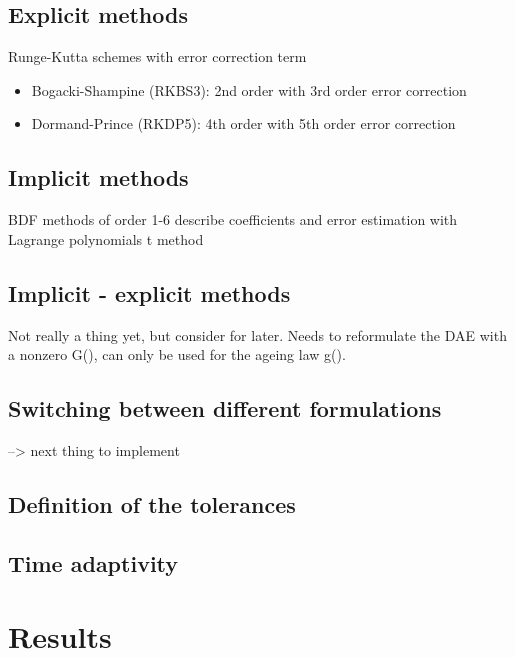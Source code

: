 \subsection{Explicit methods}
Runge-Kutta schemes with error correction term 
\begin{itemize}
    \item Bogacki-Shampine (RKBS3): 2nd order with 3rd order error correction \\
    \item Dormand-Prince (RKDP5): 4th order with 5th order error correction 
\end{itemize}

\subsection{Implicit methods}
BDF methods of order 1-6
describe coefficients and error estimation with Lagrange polynomials
t method
\subsection{Implicit - explicit methods}
Not really a thing yet, but consider for later. Needs to reformulate the DAE with a nonzero G(), can only be used for the ageing law g().

\subsection{Switching between different formulations}
 --> next thing to implement
 
\subsection{Definition of the tolerances}


\subsection{Time adaptivity}

\section{Results}
